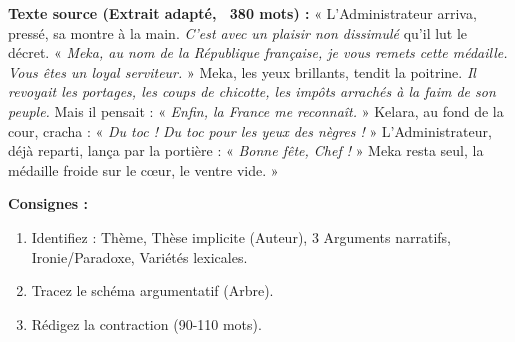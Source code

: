 \documentclass[11pt]{article}
\begin{document}
\begin{exercice}
\textbf{Texte source (Extrait adapté, ~380 mots) :}
« L'Administrateur arriva, pressé, sa montre à la main. \emph{C'est avec un plaisir non dissimulé} qu'il lut le décret. « \emph{Meka, au nom de la République française, je vous remets cette médaille.} \emph{Vous êtes un loyal serviteur.} » Meka, les yeux brillants, tendit la poitrine. \emph{Il revoyait les portages, les coups de chicotte, les impôts arrachés à la faim de son peuple.} Mais il pensait : « \emph{Enfin, la France me reconnaît.} » Kelara, au fond de la cour, cracha : « \emph{Du toc ! Du toc pour les yeux des nègres !} » L'Administrateur, déjà reparti, lança par la portière : « \emph{Bonne fête, Chef ! } » Meka resta seul, la médaille froide sur le cœur, le ventre vide. »

\textbf{Consignes :}
\begin{enumerate}
    \item Identifiez : Thème, Thèse implicite (Auteur), 3 Arguments narratifs, Ironie/Paradoxe, Variétés lexicales.
    \item Tracez le schéma argumentatif (Arbre).
    \item Rédigez la contraction (90-110 mots).
\end{enumerate}
\end{exercice}
\end{document}
